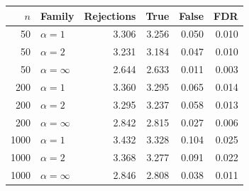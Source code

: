 \begin{tabular}{rlrrrr}
\toprule
$n$ & Family & Rejections & True & False & FDR \\
\midrule
50 & $\alpha = 1$ & {\color{blue}3.306} & {\color{blue}3.256} & 0.050 & 0.010 \\
50 & $\alpha = 2$ & 3.231 & 3.184 & 0.047 & 0.010 \\
50 & $\alpha = \infty$ & {\color{red}2.644} & {\color{red}2.633} & 0.011 & 0.003 \\
\midrule
200 & $\alpha = 1$ & {\color{blue}3.360} & {\color{blue}3.295} & 0.065 & 0.014 \\
200 & $\alpha = 2$ & 3.295 & 3.237 & 0.058 & 0.013 \\
200 & $\alpha = \infty$ & {\color{red}2.842} & {\color{red}2.815} & 0.027 & 0.006 \\
\midrule
1000 & $\alpha = 1$ & {\color{blue}3.432} & {\color{blue}3.328} & 0.104 & 0.025 \\
1000 & $\alpha = 2$ & 3.368 & 3.277 & 0.091 & 0.022 \\
1000 & $\alpha = \infty$ & {\color{red}2.846} & {\color{red}2.808} & 0.038 & 0.011 \\
\bottomrule
\end{tabular}

